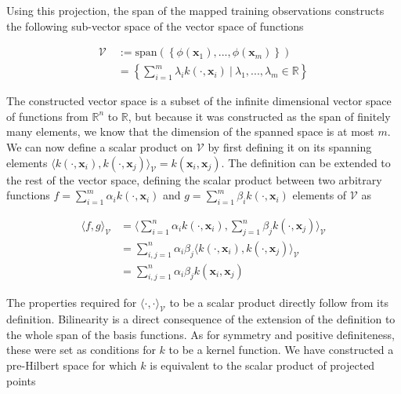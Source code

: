 Using this projection, the span of the mapped training observations constructs the following sub-vector space of the vector space of functions

\begin{equation*}
  \begin{aligned}
    \mathcal{V}\ &:= \text{span}\left(\left\{\phi(\mathbf{x}_1), ..., \phi(\mathbf{x}_m)\right\}\right)\\    
    &= \left\{ \sum_{i=1}^m\lambda_ik(\cdot, \mathbf{x}_i)\ |\ \lambda_1, ..., \lambda_m \in \mathbb{R} \right\}
  \end{aligned}
\end{equation*}

The constructed vector space is a subset of the infinite dimensional vector space of functions from $\mathbb{R}^n$ to $\mathbb{R}$, but because it was constructed as the span of finitely many elements, we know that the dimension of the spanned space is at most $m$. We can now define a scalar product on $\mathcal{V}$ by first defining it on its spanning elements $\langle k(\cdot, \mathbf{x}_i), k(\cdot, \mathbf{x}_j)\rangle_{\mathcal{V}} = k(\mathbf{x}_i, \mathbf{x}_j)$. The definition can be extended to the rest of the vector space, defining the scalar product between two arbitrary functions $f = \sum_{i=1}^m\alpha_ik(\cdot, \mathbf{x}_i)$ and $g = \sum_{i=1}^m\beta_ik(\cdot, \mathbf{x}_i)$ elements of $\mathcal{V}$ as

\begin{equation}
  \begin{aligned}
    \langle f, g\rangle_{\mathcal{V}}
    &= \langle \sum_{i=1}^n\alpha_ik(\cdot, \mathbf{x}_i), \sum_{j=1}^n\beta_jk(\cdot, \mathbf{x}_j)\rangle_{\mathcal{V}} \\
    &= \sum_{i,j=1}^n\alpha_i\beta_j \langle k\left(\cdot, \mathbf{x}_i\right), k\left(\cdot, \mathbf{x}_j\right)\rangle_{\mathcal{V}} \\
    &= \sum_{i,j=1}^n\alpha_i\beta_j k\left(\mathbf{x}_i, \mathbf{x}_j\right)
    \end{aligned}
\end{equation}

The properties required for $\langle\cdot, \cdot\rangle_{\mathcal{V}}$ to be a scalar product directly follow from its definition. Bilinearity is a direct consequence of the extension of the definition to the whole span of the basis functions. As for symmetry and positive definiteness, these were set as conditions for $k$ to be a kernel function. We have constructed a pre-Hilbert space for which $k$ is equivalent to the scalar product of projected points

